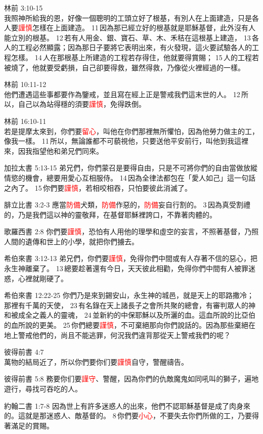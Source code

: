 林前 3:10-15\\
我照神所給我的恩，好像一個聰明的工頭立好了根基，有別人在上面建造，只是各人要\textcolor{red}{謹慎}怎樣在上面建造。 11 因為那已經立好的根基就是耶穌基督，此外沒有人能立別的根基。 12 若有人用金、銀、寶石、草、木、禾秸在這根基上建造， 13 各人的工程必然顯露；因為那日子要將它表明出來，有火發現，這火要試驗各人的工程怎樣。 14 人在那根基上所建造的工程若存得住，他就要得賞賜； 15 人的工程若被燒了，他就要受虧損，自己卻要得救，雖然得救，乃像從火裡經過的一樣。


林前 10:11-12\\
他們遭遇這些事都要作為鑒戒，並且寫在經上正是警戒我們這末世的人。 12 所以，自己以為站得穩的須要\textcolor{red}{謹慎}，免得跌倒。

林前 16:10-11\\
若是提摩太來到，你們要\textcolor{red}{留心}，叫他在你們那裡無所懼怕，因為他勞力做主的工，像我一樣。 11 所以，無論誰都不可藐視他，只要送他平安前行，叫他到我這裡來，因我指望他和弟兄們同來。

加拉太書 5:13-15
弟兄們，你們蒙召是要得自由，只是不可將你們的自由當做放縱情慾的機會，總要用愛心互相服侍。 14 因為全律法都包在「愛人如己」這一句話之內了。 15 你們要\textcolor{red}{謹慎}，若相咬相吞，只怕要彼此消滅了。

腓立比書 3:2-3
應當\textcolor{red}{防備}犬類，\textcolor{red}{防備}作惡的，\textcolor{red}{防備}妄自行割的。 3 因為真受割禮的，乃是我們這以神的靈敬拜，在基督耶穌裡誇口，不靠著肉體的。


歌羅西書 2:8
你們要\textcolor{red}{謹慎}，恐怕有人用他的理學和虛空的妄言，不照著基督，乃照人間的遺傳和世上的小學，就把你們擄去。


希伯來書 3:12-13
弟兄們，你們要\textcolor{red}{謹慎}，免得你們中間或有人存著不信的惡心，把永生神離棄了。 13 總要趁著還有今日，天天彼此相勸，免得你們中間有人被罪迷惑，心裡就剛硬了。

希伯來書 12:22-25
你們乃是來到錫安山，永生神的城邑，就是天上的耶路撒冷；那裡有千萬的天使， 23 有名錄在天上諸長子之會所共聚的總會，有審判眾人的神和被成全之義人的靈魂， 24 並新約的中保耶穌以及所灑的血。這血所說的比亞伯的血所說的更美。 25 你們總要\textcolor{red}{謹慎}，不可棄絕那向你們說話的。因為那些棄絕在地上警戒他們的，尚且不能逃罪，何況我們違背那從天上警戒我們的呢？



彼得前書 4:7\\
萬物的結局近了，所以你們要你们要\textcolor{red}{謹慎}自守，警醒禱告。

彼得前書 5:8
務要你们要\textcolor{red}{謹守}、警醒，因為你們的仇敵魔鬼如同吼叫的獅子，遍地遊行，尋找可吞吃的人。

約翰二書 1:7-8
因為世上有許多迷惑人的出來，他們不認耶穌基督是成了肉身來的。這就是那迷惑人、敵基督的。 8 你們要\textcolor{red}{小心}，不要失去你們所做的工，乃要得著滿足的賞賜。









